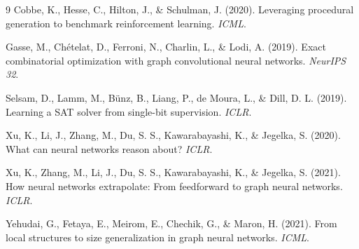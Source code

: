 \documentclass[12pt]{article}
\begin{document}
\begin{thebibliography}{9}
Cobbe, K., Hesse, C., Hilton, J., \& Schulman, J. (2020). Leveraging procedural generation to benchmark reinforcement learning. \emph{ICML}.

Gasse, M., Ch\'etelat, D., Ferroni, N., Charlin, L., \& Lodi, A. (2019). Exact combinatorial optimization with graph convolutional neural networks. \emph{NeurIPS 32}.

Selsam, D., Lamm, M., B\"unz, B., Liang, P., de Moura, L., \& Dill, D. L. (2019). Learning a SAT solver from single-bit supervision. \emph{ICLR}.

Xu, K., Li, J., Zhang, M., Du, S. S., Kawarabayashi, K., \& Jegelka, S. (2020). What can neural networks reason about? \emph{ICLR}.

Xu, K., Zhang, M., Li, J., Du, S. S., Kawarabayashi, K., \& Jegelka, S. (2021). How neural networks extrapolate: From feedforward to graph neural networks. \emph{ICLR}.

Yehudai, G., Fetaya, E., Meirom, E., Chechik, G., \& Maron, H. (2021). From local structures to size generalization in graph neural networks. \emph{ICML}.
\end{thebibliography}
\end{document}
